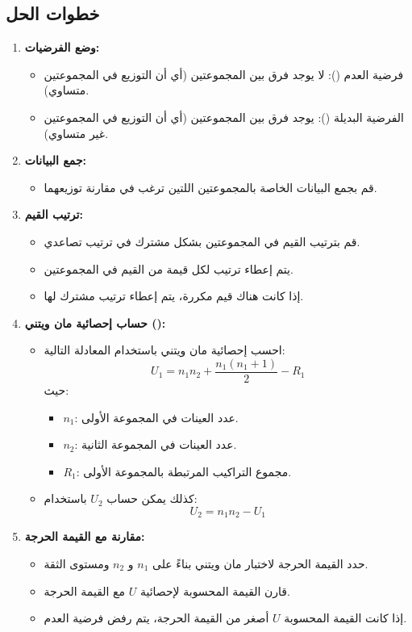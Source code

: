 \subsection*{خطوات الحل}

\begin{enumerate}
	\item \textbf{وضع الفرضيات:}
	\begin{itemize}
		\item فرضية العدم (): لا يوجد فرق بين المجموعتين (أي أن التوزيع في المجموعتين متساوي).
		\item الفرضية البديلة (): يوجد فرق بين المجموعتين (أي أن التوزيع في المجموعتين غير متساوي).
	\end{itemize}
	
	\item \textbf{جمع البيانات:}
	\begin{itemize}
		\item قم بجمع البيانات الخاصة بالمجموعتين اللتين ترغب في مقارنة توزيعهما.
	\end{itemize}
	
	\item \textbf{ترتيب القيم:}
	\begin{itemize}
		\item قم بترتيب القيم في المجموعتين بشكل مشترك في ترتيب تصاعدي.
		\item يتم إعطاء ترتيب لكل قيمة من القيم في المجموعتين.
		\item إذا كانت هناك قيم مكررة، يتم إعطاء ترتيب مشترك لها.
	\end{itemize}
	
	\item \textbf{حساب إحصائية مان ويتني ():}
	\begin{itemize}
		\item احسب إحصائية مان ويتني باستخدام المعادلة التالية:
		\[
		U_1 = n_1 n_2 + \frac{n_1(n_1 + 1)}{2} - R_1
		\]
		حيث:
		\begin{itemize}
			\item \( n_1 \): عدد العينات في المجموعة الأولى.
			\item \( n_2 \): عدد العينات في المجموعة الثانية.
			\item \( R_1 \): مجموع التراكيب المرتبطة بالمجموعة الأولى.
		\end{itemize}
		\item كذلك يمكن حساب \( U_2 \) باستخدام:
		\[
		U_2 = n_1 n_2 - U_1
		\]
	\end{itemize}
	
	\item \textbf{مقارنة مع القيمة الحرجة:}
	\begin{itemize}
		\item حدد القيمة الحرجة لاختبار مان ويتني بناءً على {$n_1$} و $n_2$ ومستوى الثقة.
		\item قارن القيمة المحسوبة لإحصائية \( U \) مع القيمة الحرجة.
		\item إذا كانت القيمة المحسوبة \( U \) أصغر من القيمة الحرجة، يتم رفض فرضية العدم.
	\end{itemize}
	

\end{enumerate}
